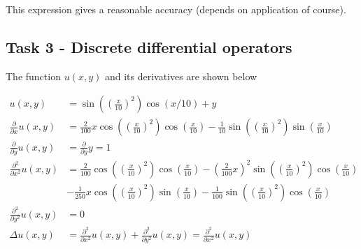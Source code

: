 \documentclass[paper=a4, fontsize=12pt]{article} %
\begin{document}
This expression gives a reasonable accuracy (depends on application of course).






%
%
%
%
%
%

\subsection*{Task 3 - Discrete differential operators}

The function $u(x,y)$ and its derivatives are shown below

\begin{align*}
u(x,y) &= \sin\left(\left(\frac{x}{10}\right) ^2\right ) \cos(x/10)+y \\
\frac{\partial}{\partial x} u(x,y) &= \frac{2}{100}x\cos\left(\left(\frac{x}{10}\right) ^2\right )\cos\left(\frac{x}{10}\right )- \frac{1}{10}\sin\left(\left(\frac{x}{10}\right) ^2\right )\sin\left (\frac{x}{10}\right )\\
\frac{\partial}{\partial y} u(x,y) &= \frac{\partial}{\partial y}y = 1   \\
\frac{\partial^2}{\partial x^2} u(x,y) &= \frac{2}{100}\cos\left(\left(\frac{x}{10}\right) ^2\right )\cos\left(\frac{x}{10}\right ) - \left ( \frac{2}{100}x\right )^2 \sin \left(\left(\frac{x}{10}\right) ^2\right )\cos\left(\frac{x}{10}\right ) \\
 &- \frac{1}{250}x\cos\left(\left(\frac{x}{10}\right) ^2\right )\sin\left(\frac{x}{10}\right ) - \frac{1}{100}\sin\left(\left(\frac{x}{10}\right) ^2\right )\cos\left (\frac{x}{10}\right )\\
\frac{\partial^2}{\partial y^2} u(x,y) &= 0 \\
\Delta u(x,y) &= \frac{\partial^2}{\partial x^2} u(x,y) + \frac{\partial^2}{\partial y^2} u(x,y) =  \frac{\partial^2}{\partial x^2} u(x,y)
\end{align*}
\end{document}
